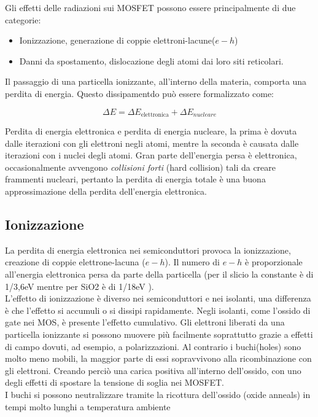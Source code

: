 
Gli effetti delle radiazioni sui MOSFET possono essere principalmente di due categorie\cite{bib:Effetti_Radiazioni_1987}:
\begin{itemize}
	\item Ionizzazione, generazione di coppie elettroni-lacune($e-h$)
	\item Danni da spostamento, dislocazione degli atomi dai loro siti reticolari.
\end{itemize}
Il passaggio di una particella ionizzante, all'interno della materia, comporta una perdita di energia. Questo dissipamentdo può essere formalizzato come:

$$ \Delta E = \Delta E_{\text{elettronica}} + \Delta E_{nucleare} $$

Perdita di energia elettronica e perdita di energia nucleare, la prima è dovuta dalle iterazioni con gli elettroni negli atomi, mentre la seconda è causata dalle iterazioni con i nuclei degli atomi.
Gran parte dell'energia persa è elettronica, occasionalmente avvengono \textit{collisioni forti} (hard collision) tali da creare frammenti nucleari, pertanto la perdita di energia totale è una buona approssimazione della perdita dell'energia elettronica\cite{bib:Effetti_Radiazioni_NASA}.
\\

\subsection{Ionizzazione}
La perdita di energia elettronica nei semiconduttori provoca la ionizzazione, creazione di coppie elettrone-lacuna ($e-h$). Il numero di $e-h$ è proporzionale all'energia elettronica persa da parte della particella (per il slicio la constante è di 1/3,6eV mentre per SiO2 è di 1/18eV \cite{bib:Effetti_Radiazioni_NASA}).
\\

L'effetto di ionizzazione è diverso nei semiconduttori e nei isolanti, una differenza è che l'effetto si accumuli o si dissipi rapidamente.
Negli isolanti, come l'ossido di gate nei MOS, è presente l'effetto cumulativo. Gli elettroni liberati da una particella ionizzante si possono muovere più facilmente soprattutto grazie a effetti di campo dovuti, ad esempio, a polarizzazioni.
Al contrario i buchi(holes) sono molto meno mobili, la maggior parte di essi sopravvivono alla ricombinazione con gli elettroni. Creando perciò una carica positiva all'interno dell'ossido, con uno degli effetti di spostare la tensione di soglia nei MOSFET.
\\
I buchi si possono neutralizzare tramite la ricottura dell'ossido (oxide anneals) in tempi molto lunghi a temperatura ambiente


